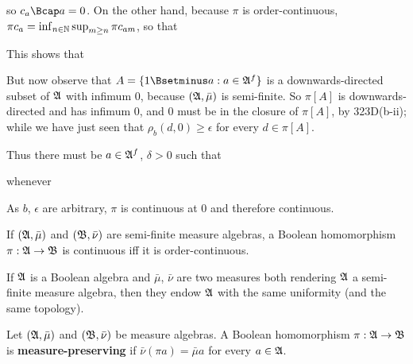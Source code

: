 {
     
\noindent so $c_a\Bcap a=0$.   On the other hand, because $\pi$ is
order-continuous, $\pi c_a=\inf_{n\in\Bbb N}\sup_{m\ge n}\pi c_{am}$,
so that
     
     
\noindent This shows that
     
     
\noindent But now observe that $A=\{1\Bsetminus a:a\in\frak A^f\}$ is a
downwards-directed subset of $\frak A$ with infimum $0$, because 
$(\frak A,\bar\mu)$ is semi-finite.   So $\pi[A]$ is downwards-directed and has infimum $0$, 
and $0$ must be in the closure of $\pi[A]$, by 323D(b-ii);
while we have just seen that $\rho_b(d,0)\ge\epsilon$ for every
$d\in\pi[A]$.   \Bang
     
Thus there must be $a\in\frak A^f$, $\delta>0$ such that
     
     
\noindent whenever
     
     
\noindent As $b$, $\epsilon$ are arbitrary, $\pi$ is continuous at $0$
and therefore continuous.
}%
     
 If $(\frak A,\bar\mu)$ and $(\frak B,\bar\nu)$
are semi-finite measure algebras, a Boolean homomorphism 
$\pi:\frak A\to\frak B$ is continuous iff it is order-continuous.
     
 If $\frak A$ is a Boolean algebra and
$\bar\mu$,
$\bar\nu$ are two measures both rendering $\frak A$ a semi-finite
measure
algebra, then they endow $\frak A$ with the same uniformity
(and the same topology).
     
     
 Let $(\frak A,\bar\mu)$ and
$(\frak B,\bar\nu)$ be
measure algebras.   A Boolean homomorphism $\pi:\frak A\to\frak B$ is
{\bf measure-preserving} if $\bar\nu(\pi a)=\bar\mu a$ for every
$a\in\frak A$.
     
